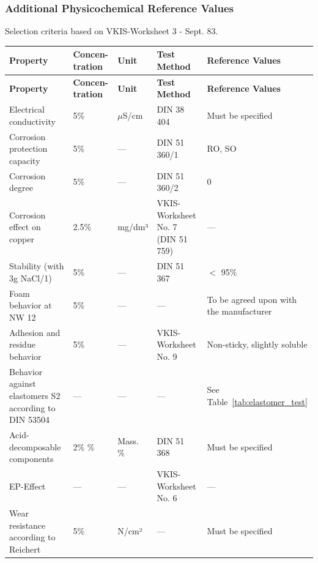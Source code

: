 \newpage

\subsubsection*{Additional Physicochemical Reference Values}
\setcounter{page}{2}
Selection criteria based on VKIS-Worksheet 3 - Sept. 83.

\renewcommand{\arraystretch}{1.3}
\begin{longtable}{|p{5cm}|p{1.5cm}|p{3.5cm}|p{3cm}|p{2.5cm}|}
    \hline
    \textbf{Property} & \textbf{Concen-} \newline \textbf{tration} & \textbf{Unit} & \textbf{Test Method} & \textbf{Reference Values} \\
    \hline
    \endfirsthead

    \hline
    \textbf{Property} & \textbf{Concen-} \newline \textbf{tration} & \textbf{Unit} & \textbf{Test Method} & \textbf{Reference Values} \\
    \hline
    \endhead

    Electrical conductivity & 5\% & $\mu$S/cm & DIN 38 404 & Must be specified \\
    \hline
    Corrosion protection capacity & 5\% & --- & DIN 51 360/1 & RO, SO\footnotemark[3] \\
    \hline
    Corrosion degree & 5\% & --- & DIN 51 360/2 & 0 \\
    \hline
    Corrosion effect on copper\footnotemark[4] & 2.5\% & mg/dm³ & VKIS-Worksheet No. 7 \newline (DIN 51 759) & --- \\
    \hline
    Stability \newline (with 3g NaCl/1) & 5\% & --- & DIN 51 367 & $<$ 95\% \\
    \hline
    Foam behavior at NW 12 & 5\% & --- & --- & To be agreed upon with the manufacturer \\
    \hline
    Adhesion and residue behavior & 5\% & --- & VKIS-Worksheet No. 9 & Non-sticky, slightly soluble \\
    \hline
    Behavior against elastomers S2 according to DIN 53504\footnotemark[4] & --- & --- & --- & See Table~\ref{tab:elastomer_test} \\
    \hline
    Acid-decomposable components & 2\% \newline 10\% & Mass. \% & DIN 51 368 & Must be specified \\
    \hline
    EP-Effect & --- & --- & VKIS-Worksheet No. 6 & --- \\
    \hline
    Wear resistance according to Reichert & 5\% & N/cm² & --- & Must be specified \\
    \hline
\end{longtable}


